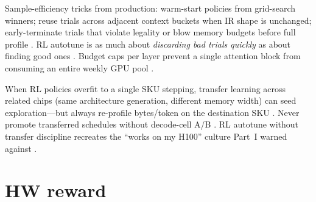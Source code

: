 Sample-efficiency tricks from production: warm-start policies from grid-search winners; reuse trials across adjacent context buckets when IR shape is unchanged; early-terminate trials that violate legality or blow memory budgets before full profile \citep{yirage2026,chen2020compilerbasedhardw,memoryfloor2026,taxbreak2026,patel2025llminference,amd2024xdna,amd2024aie,dlbook,semianalysis2024tma,dao2022flashattention,kwon2023vllm,liu2024deepseekv3,dao2023flashdecoding,nvidia2024cudagraphs,nvidia2022hopper}. RL autotune is as much about \emph{discarding bad trials quickly} as about finding good ones \citep{chen2020compilerbasedhardw,yirage2026,memoryfloor2026,taxbreak2026,patel2025llminference,dlbook,amd2024aie,semianalysis2024tma,amd2024xdna,dao2022flashattention,kwon2023vllm,liu2024deepseekv3,dao2023flashdecoding,nvidia2024cudagraphs,nvidia2022hopper}. Budget caps per layer prevent a single attention block from consuming an entire weekly GPU pool \citep{patel2025llminference,yirage2026,chen2020compilerbasedhardw,memoryfloor2026,taxbreak2026,amd2024aie,dlbook,semianalysis2024tma,amd2024xdna,dao2022flashattention,dao2023flashdecoding,nvidia2024cudagraphs,nvidia2022hopper,kwon2023vllm,liu2024deepseekv3}.

When RL policies overfit to a single SKU stepping, transfer learning across related chips (same architecture generation, different memory width) can seed exploration---but always re-profile bytes/token on the destination SKU \citep{semianalysis2024tma,amd2024xdna,nvidia2022hopper,yirage2026,chen2020compilerbasedhardw,memoryfloor2026,taxbreak2026,patel2025llminference,dlbook,amd2024aie,dao2022flashattention,kwon2023vllm,liu2024deepseekv3,dao2023flashdecoding,nvidia2024cudagraphs}. Never promote transferred schedules without decode-cell A/B \citep{patel2025llminference,yirage2026,chen2020compilerbasedhardw,memoryfloor2026,taxbreak2026,amd2024aie,dlbook,semianalysis2024tma,amd2024xdna,dao2022flashattention,dao2023flashdecoding,nvidia2024cudagraphs,nvidia2022hopper,kwon2023vllm,liu2024deepseekv3}. RL autotune without transfer discipline recreates the ``works on my H100'' culture Part~I warned against \citep{patel2025llminference,taxbreak2026,memoryfloor2026,yirage2026,chen2020compilerbasedhardw,dlbook,amd2024xdna,amd2024aie,semianalysis2024tma,dao2022flashattention,dao2023flashdecoding,nvidia2024cudagraphs,nvidia2022hopper,kwon2023vllm,liu2024deepseekv3}.

\section{HW reward}
\label{sec:ch25_hw_reward}

